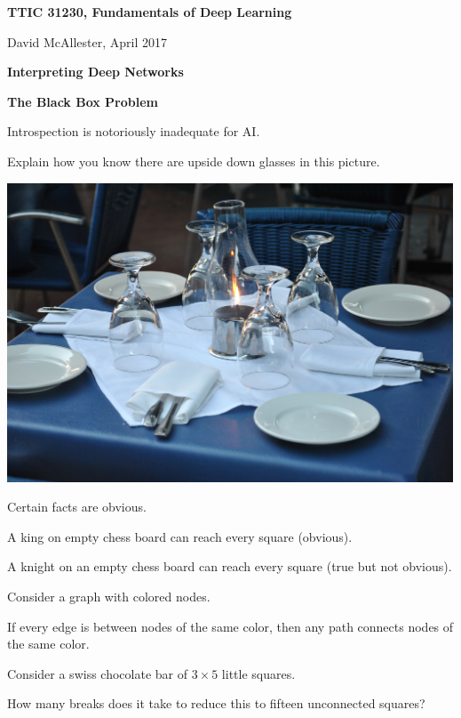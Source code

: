 





{\Huge

  \centerline{\bf TTIC 31230, Fundamentals of Deep Learning}
  \bigskip
  \centerline{David McAllester, April 2017}
  \vfill
  \centerline{\bf Interpreting Deep Networks}
  \vfill
  \centerline{\bf The Black Box Problem}
  \vfill  
  \vfill


Introspection is notoriously inadequate for AI.

\vfill
Explain how you know there are upside down glasses in this picture.
\vfill
\centerline{\includegraphics[height = 3.5in]{../images/table-setting}}


Certain facts are obvious.

\vfill
A king on empty chess board can reach every square (obvious).

\vfill
A knight on an empty chess board can reach every square (true but not obvious).


Consider a graph with colored nodes.

\vfill
If every edge is between nodes of the same color, then any path connects nodes of the same color.

\vfill
Consider a swiss chocolate bar of $3 \times 5$ little squares.

\vfill
How many breaks does it take to reduce this to fifteen unconnected squares?


}
